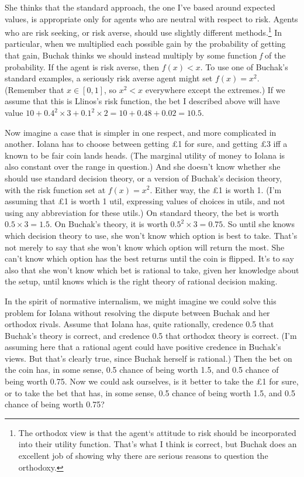 She thinks that the standard approach, the one I've based around expected values, is appropriate only for agents who are neutral with respect to risk. Agents who are risk seeking, or risk averse, should use slightly different methods.\footnote{The orthodox view is that the agent`s attitude to risk should be incorporated into their utility function. That's what I think is correct, but Buchak does an excellent job of showing why there are serious reasons to question the orthodoxy.} In particular, when we multiplied each possible gain by the probability of getting that gain, Buchak thinks we should instead multiply by some function \emph{f} of the probability. If the agent is risk averse, then $f(x) < x$. To use one of Buchak's standard examples, a seriously risk averse agent might set $f(x) = x^2$. (Remember that $x \in [0, 1]$, so $x^2 < x$ everywhere except the extremes.) If we assume that this is \gls{Llinos}'s risk function, the bet I described above will have value $10 + 0.4^2 \times 3 + 0.1^2 \times 2 = 10 + 0.48 + 0.02 = 10.5$.

Now imagine a case that is simpler in one respect, and more complicated in another. \gls{Iolana} has to choose between getting £1 for sure, and getting £3 iff a known to be fair coin lands heads. (The marginal utility of money to Iolana is also constant over the range in question.) And she doesn't know whether she should use standard decision theory, or a version of Buchak's decision theory, with the risk function set at $f(x) = x^2$. Either way, the £1 is worth 1. (I'm assuming that £1 is worth 1 util, expressing values of choices in utils, and not using any abbreviation for these utils.) On standard theory, the bet is worth $0.5 \times 3 = 1.5$. On Buchak's theory, it is worth $0.5^2 \times 3 = 0.75$. So until she knows which decision theory to use, she won't know which option is best to take. That's not merely to say that she won't know which option will return the most. She can't know which option has the best returns until the coin is flipped. It's to say also that she won't know which bet is rational to take, given her knowledge about the setup, until knows which is the right theory of rational decision making.

In the spirit of normative internalism, we might imagine we could solve this problem for \gls{Iolana} without resolving the dispute between Buchak and her orthodox rivals. Assume that \gls{Iolana} has, quite rationally, credence 0.5 that Buchak's theory is correct, and credence 0.5 that orthodox theory is correct. (I'm assuming here that a rational agent could have positive credence in Buchak's views. But that's clearly true, since Buchak herself is rational.) Then the bet on the coin has, in some sense, 0.5 chance of being worth 1.5, and 0.5 chance of being worth 0.75. Now we could ask ourselves, is it better to take the £1 for sure, or to take the bet that has, in some sense, 0.5 chance of being worth 1.5, and 0.5 chance of being worth 0.75?

